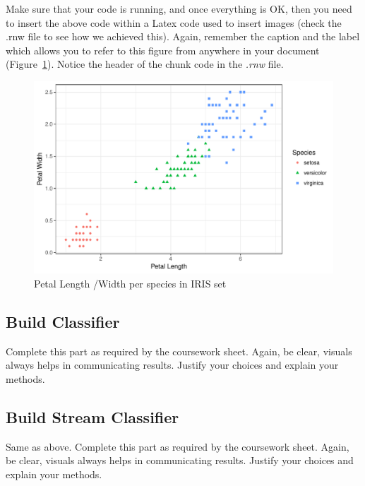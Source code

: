 \documentclass[10pt]{article}\usepackage[]{graphicx}\usepackage[]{color}
\newenvironment{knitrout}{}{} %
\begin{document}
Make sure that your code is running, and once everything is OK, then you need to insert the above code within a Latex code used to insert images (check the .rnw file to see how we achieved this). Again, remember the caption and the label which allows you to refer to this figure from anywhere in your document (Figure~\ref{fig1}). Notice the header of the chunk code in the \textit{.rnw} file. 

\begin{figure}[H]
\begin{center}

\begin{knitrout}
\color{fgcolor}
\includegraphics[width=.76\linewidth]{figure/unnamed-chunk-7-1} 

\end{knitrout}
\caption {Petal Length /Width per species in IRIS set}
\label{fig1}
\end {center}
\end {figure}




\subsection{Build Classifier}


Complete this part as required by the coursework sheet. Again, be clear, visuals always helps in communicating results. Justify your choices and explain your methods. 




\subsection{Build Stream Classifier}

Same as above. Complete this part as required by the coursework sheet. Again, be clear, visuals always helps in communicating results. Justify your choices and explain your methods. 
\end{document}
